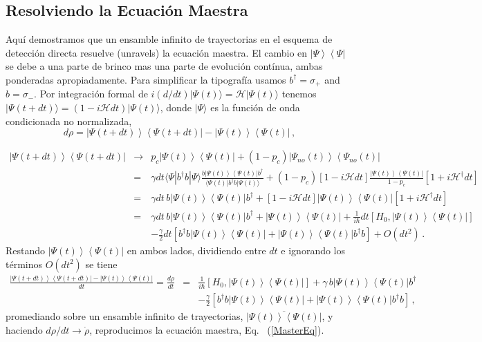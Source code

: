 \documentclass[twocolumn,aps,eqsecnum,showkeys,amsmath]{revtex4}
\newcommand{\mcH}{\mathcal{H}} 	%
\providecommand{\bra}[1]{\langle #1 \rvert}
\providecommand{\ket}[1]{\lvert #1 \rangle}
\newcommand{\ketbra}[2]{\left| {#1} \right\rangle\left\langle {#2}\right|}
\begin{document}
\subsection{Resolviendo la Ecuaci\'on Maestra}
Aqu\'i demostramos que un ensamble infinito de trayectorias en el esquema 
de detecci\'on directa resuelve (unravels) la ecuaci\'on maestra. El cambio en 
$\ketbra{\Psi }{ \Psi}$ se debe a una parte de brinco mas una parte de 
evoluci\'on cont\'inua, ambas ponderadas apropiadamente. Para simplificar la 
tipograf\'ia usamos  $b^\dag =\sigma_+$ and $b= \sigma_-$. Por integraci\'on 
formal de  $i(d/dt) \ket{\Psi(t)} = \mcH \ket{\Psi(t)}$ tenemos 
$\ket{\Psi(t+dt)} = (1 -i \mcH dt) \ket{\Psi(t)}$, donde $\ket{\Psi}$ es la funci\'on 
de onda condicionada no normalizada, 
%
\begin{equation}
d \rho = \ketbra{\Psi(t+dt) }{ \Psi(t+dt)} - \ketbra{\Psi(t) }{ \Psi(t)} 	\,,
\end{equation}
\begin{widetext}
%
\begin{eqnarray*}
\ketbra{\Psi(t+dt) }{ \Psi(t+dt)}  
	& \rightarrow &	p_c \ketbra{\Psi (t) }{ \Psi (t)} 	
	 +(1 -p_c) \ketbra{\Psi_{no}(t) }{ \Psi_{no}(t)} 	\\
&=& 	\gamma dt \langle \Psi |b^{\dag}b| \Psi \rangle 
	\frac{b \ketbra{\Psi(t) }{ \Psi(t)} b^\dag}
	{ \bra{\Psi(t)} b^\dag b \ket{\Psi(t)} }		
	 +(1 -p_c)[1 - i \mcH dt]	
	\frac{ \ketbra{\Psi (t) }{ \Psi (t)} }{1-p_c}  [1 +i \mcH^\dag dt]	\\
&=& 	\gamma dt  \,b \ketbra{\Psi(t) }{ \Psi(t)} b^\dag 		
	 +[1 - i \mcH dt]	 \ketbra{\Psi (t) }{ \Psi (t)}   [1 +i \mcH^\dag dt]	\\
&=& \gamma dt\, b \ketbra{\Psi (t) }{ \Psi (t)} b^\dag +\ketbra{\Psi (t) }{ \Psi (t)}  		 
	+\frac{1}{i\hbar} dt [H_0, \ketbra{\Psi (t) }{ \Psi (t)} ]	\\ 	
	 && -\frac{\gamma}{2} dt \left[ b^\dag b \ketbra{\Psi (t) }{ \Psi (t)} 	 
	 +\ketbra{\Psi (t) }{ \Psi (t)} b^\dag b \right] 	+O(dt^2)  \,.
\end{eqnarray*}
Restando $\ketbra{\Psi (t)}{ \Psi(t)}$ en ambos lados, dividiendo entre  $dt$  
e ignorando los t\'erminos $O(dt^2)$ se tiene 
%
\begin{eqnarray*}
\frac{ \ketbra{\Psi(t+dt) }{ \Psi(t+dt)} - \ketbra{\Psi (t) }{ \Psi (t)} }{dt}	
	= \frac{d \rho}{dt} 
	&=& \frac{1}{i\hbar} [H_0, \ketbra{\Psi (t) }{ \Psi (t)} ] 
	+\gamma \, b \ketbra{\Psi (t) }{ \Psi (t)} b^\dag	 		\\ 
	&& -\frac{\gamma}{2} \left[ b^\dag b \ketbra{\Psi (t) }{ \Psi (t)} 
	+\ketbra{\Psi (t) }{ \Psi (t)} b^\dag b \right] 	  \,,
\end{eqnarray*}
promediando sobre un ensamble infinito de trayectorias, 
$ \overline{ \ketbra{\Psi (t) }{ \Psi (t)} }$, y haciendo $d \rho /dt \to \dot{\rho}$, reproducimos la ecuaci\'on maestra, Eq.~ (\ref{MasterEq}). 
\end{widetext}
\end{document}
